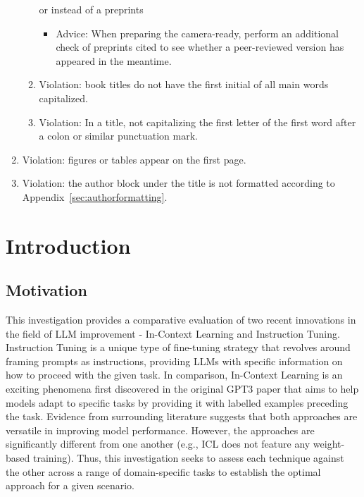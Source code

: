 \documentclass[11pt,a4paper]{article}
\begin{document}
\begin{enumerate}
\begin{enumerate}
  or instead of a preprints
    \begin{itemize}
     \item Advice: When preparing the camera-ready, perform an additional check
     of preprints cited to see whether a peer-reviewed version has appeared
     in the meantime.
  \end{itemize}
  \item Violation: book titles do not have the first initial of all main words
  capitalized.
  \item Violation: In a title, not capitalizing the first letter of the first word
  after a colon or similar punctuation mark.
\end{enumerate}
\item Violation: figures or tables appear on the first page.
  \item Violation: the author block under the title is not
    formatted according to Appendix~\ref{sec:authorformatting}.
\end{enumerate}
\else
\section{Introduction}

\subsection{Motivation}
This investigation provides a comparative evaluation of two recent innovations in 
the field of LLM improvement - In-Context Learning and Instruction Tuning. Instruction Tuning 
is a unique type of fine-tuning strategy that revolves around framing prompts as instructions, providing 
LLMs with specific information on how to proceed with the given task. In comparison, In-Context Learning 
is an exciting phenomena first discovered in the original GPT3 paper that aims to help models adapt 
to specific tasks by providing it with labelled examples preceding the task. Evidence 
from surrounding literature suggests that both approaches are versatile in improving model performance. However,
the approaches are significantly different from one another (e.g., ICL does not feature any 
weight-based training). Thus, this investigation seeks to assess each technique against the other
across a range of domain-specific tasks to establish the optimal approach for a given scenario.
\end{document}
